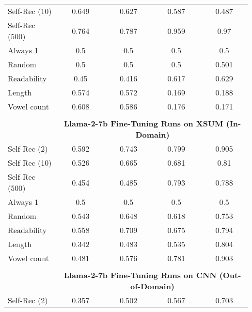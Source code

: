 \begin{table}[h]
\begin{tabular}{l|cccc}
        Self-Rec (10)                      & 0.649       & 0.627       & 0.587       & 0.487       \\
        Self-Rec (500)                     & 0.764       & 0.787       & 0.959       & 0.97        \\
        Always 1                           & 0.5         & 0.5         & 0.5         & 0.5         \\
        Random                             & 0.5         & 0.5         & 0.5         & 0.501       \\
        Readability                        & 0.45        & 0.416       & 0.617       & 0.629       \\
        Length                             & 0.574       & 0.572       & 0.169       & 0.188       \\
        Vowel count                        & 0.608       & 0.586       & 0.176       & 0.171       \\
        \multicolumn{5}{c}{} \\
        \multicolumn{1}{c}{} & \multicolumn{4}{c}{\textbf{Llama-2-7b Fine-Tuning Runs on XSUM (In-Domain)}} \\
        Self-Rec (2)                       & 0.592       & 0.743       & 0.799       & 0.905       \\
        Self-Rec (10)                      & 0.526       & 0.665       & 0.681       & 0.81        \\
        Self-Rec (500)                     & 0.454       & 0.485       & 0.793       & 0.788       \\
        Always 1                           & 0.5         & 0.5         & 0.5         & 0.5         \\
        Random                             & 0.543       & 0.648       & 0.618       & 0.753       \\
        Readability                        & 0.558       & 0.709       & 0.675       & 0.794       \\
        Length                             & 0.342       & 0.483       & 0.535       & 0.804       \\
        Vowel count                        & 0.481       & 0.576       & 0.781       & 0.903       \\
        \multicolumn{5}{c}{} \\
        \multicolumn{1}{c}{} & \multicolumn{4}{c}{\textbf{Llama-2-7b Fine-Tuning Runs on CNN (Out-of-Domain)}} \\
        Self-Rec (2)                       & 0.357       & 0.502       & 0.567       & 0.703       \\

\end{tabular}
\end{table}
